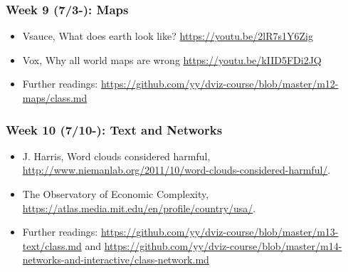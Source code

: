 
\subsubsection{Week 9 (7/3-): Maps }%

\begin{itemize}\itemsep0em 
\item Vsauce, What does earth look like? \url{https://youtu.be/2lR7s1Y6Zig}
\item Vox, Why all world maps are wrong \url{https://youtu.be/kIID5FDi2JQ}
\item Further readings: \url{https://github.com/yy/dviz-course/blob/master/m12-maps/class.md}
\end{itemize}	
\subsubsection{Week 10 (7/10-): Text and Networks } %

\begin{itemize}\itemsep0em 
\item J. Harris, Word clouds considered harmful, \url{http://www.niemanlab.org/2011/10/word-clouds-considered-harmful/}. 
\item The Observatory of Economic Complexity, \url{https://atlas.media.mit.edu/en/profile/country/usa/}.
\item Further readings: \url{https://github.com/yy/dviz-course/blob/master/m13-text/class.md} and \url{https://github.com/yy/dviz-course/blob/master/m14-networks-and-interactive/class-network.md}
\end{itemize}	
